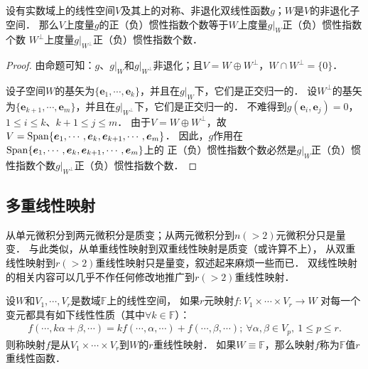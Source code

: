 \begin{proposition}
    设有实数域上的线性空间$V$及其上的对称、非退化双线性函数$g$；$W$是$V$的非退化子空间．
    那么$V$上度量$g$的正（负）惯性指数个数等于$W$上度量$g|_W$正（负）惯性指数个数
    $W^\perp$上度量$g|_{W^\perp}$正（负）惯性指数个数．
\end{proposition}
\begin{proof}
    由命题可知：$g$、$g|_W$和$g|_{W^\perp}$非退化；且$V=W\oplus W^\perp$，$W\cap W^\perp=\{0\}$．
    
    设子空间$W$的基矢为$\{\boldsymbol{e}_1,\cdots,\boldsymbol{e}_k\}$，并且在$g|_W$下，它们是正交归一的．
    设$W^\perp$的基矢为$\{\boldsymbol{e}_{k+1},\cdots,\boldsymbol{e}_m\}$，并且在$g|_{W^\perp}$下，它们是正交归一的．
    不难得到$g(\boldsymbol{e}_i,\boldsymbol{e}_j)=0$，$1\leqslant i\leqslant k$、$k+1 \leqslant j \leqslant m $．    
    由于$V=W\oplus W^\perp$，故$V={\rm Span}\{\boldsymbol{e}_1,\cdots,\boldsymbol{e}_k,\boldsymbol{e}_{k+1},\cdots,\boldsymbol{e}_m\}$．
    因此，$g$作用在${\rm Span}\{\boldsymbol{e}_1,\cdots,\boldsymbol{e}_k,\boldsymbol{e}_{k+1},\cdots,\boldsymbol{e}_m\}$上的
    正（负）惯性指数个数必然是$g|_W$正（负）惯性指数个数$g|_{W^\perp}$正（负）惯性指数个数．
\end{proof}










\subsection{多重线性映射}\label{chmla:sec_multi-linear-function}

从单元微积分到两元微积分是质变；从两元微积分到$n(>2)$元微积分只是量变．
与此类似，从单重线性映射到双重线性映射是质变（或许算不上），
从双重线性映射到$r(>2)$重线性映射只是量变，叙述起来麻烦一些而已．
双线性映射的相关内容可以几乎不作任何修改地推广到$r(>2)$重线性映射．



\begin{definition}\label{chmla:def_nlinear-fun}
    设$W$和$V_1,\cdots,V_r$是数域$\mathbb{F}$上的线性空间，
    如果$r$元映射$f:V_1 \times  \cdots \times V_r \to W$
    对每一个变元都具有如下线性性质（其中$\forall k \in \mathbb{F}$）： 
    \begin{align*}
        f(\cdots, k\alpha+\beta, \cdots )= k f(\cdots,\alpha,\cdots) + f(\cdots,\beta,\cdots);
        \  \forall \alpha,\beta \in V_p ,  \  1 \leqslant p \leqslant r.
    \end{align*}
    则称映射$f$是从$V_1 \times  \cdots \times V_r$到$W$的$r${\heiti 重线性映射}．
    如果$W\equiv \mathbb{F}$，那么映射$f$称为$\mathbb{F}$值$r${\heiti 重线性函数}．
\end{definition}


